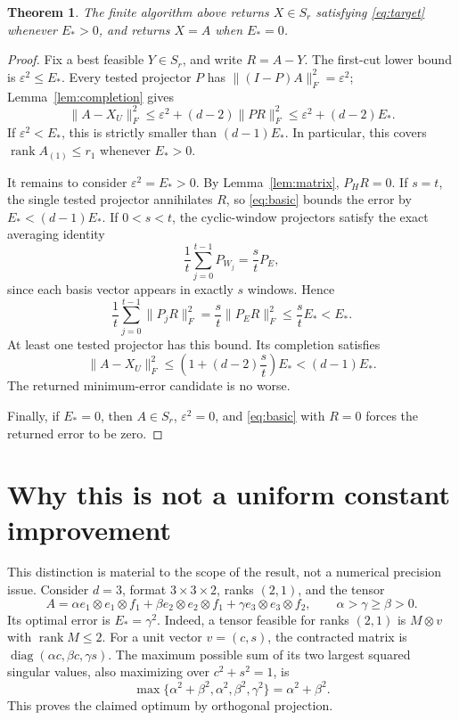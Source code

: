 \documentclass[11pt]{article}
\newtheorem{theorem}{Theorem}
\DeclareMathOperator{\rank}{rank}
\begin{document}
\begin{theorem}\label{thm:strict}
The finite algorithm above returns $X\in S_r$ satisfying
\eqref{eq:target} whenever $E_*>0$, and returns $X=A$ when $E_*=0$.
\end{theorem}
\begin{proof}
Fix a best feasible $Y\in S_r$, and write $R=A-Y$.
The first-cut lower bound is $\varepsilon^2\le E_*$.
Every tested projector $P$ has $\|(I-P)A\|_F^2=\varepsilon^2$;
Lemma~\ref{lem:completion} gives
\begin{equation}\label{eq:basic}
 \|A-X_U\|_F^2
 \le\varepsilon^2+(d-2)\|PR\|_F^2
 \le\varepsilon^2+(d-2)E_*.
\end{equation}
If $\varepsilon^2<E_*$, this is strictly smaller than $(d-1)E_*$.
In particular, this covers $\rank A_{(1)}\le r_1$ whenever $E_*>0$.

It remains to consider $\varepsilon^2=E_*>0$. By
Lemma~\ref{lem:matrix}, $P_HR=0$. If $s=t$, the single tested
projector annihilates $R$, so \eqref{eq:basic} bounds the error by
$E_*<(d-1)E_*$. If $0<s<t$, the cyclic-window projectors satisfy the
exact averaging identity
\[
 \frac1t\sum_{j=0}^{t-1}P_{W_j}=\frac{s}{t}P_E,
\]
since each basis vector appears in exactly $s$ windows. Hence
\[
 \frac1t\sum_{j=0}^{t-1}\|P_jR\|_F^2
 =\frac{s}{t}\|P_ER\|_F^2
 \le\frac{s}{t}E_*<E_*.
\]
At least one tested projector has this bound. Its completion satisfies
\[
 \|A-X_U\|_F^2
 \le\left(1+(d-2)\frac{s}{t}\right)E_*
 <(d-1)E_*.
\]
The returned minimum-error candidate is no worse.

Finally, if $E_*=0$, then $A\in S_r$, $\varepsilon^2=0$, and
\eqref{eq:basic} with $R=0$ forces the returned error to be zero.
\end{proof}

\section{Why this is not a uniform constant improvement}
This distinction is material to the scope of the result, not a numerical
precision issue. Consider $d=3$, format $3\times3\times2$, ranks $(2,1)$,
and the tensor
\[
 A=\alpha e_1\otimes e_1\otimes f_1
   +\beta e_2\otimes e_2\otimes f_1
   +\gamma e_3\otimes e_3\otimes f_2,
 \qquad \alpha>\gamma\ge\beta>0.
\]
Its optimal error is $E_*=\gamma^2$.
Indeed, a tensor feasible for ranks $(2,1)$ is $M\otimes v$ with
$\rank M\le2$. For a unit vector $v=(c,s)$, the contracted matrix is
$\operatorname{diag}(\alpha c,\beta c,\gamma s)$. The maximum possible
sum of its two largest squared singular values, also maximizing over
$c^2+s^2=1$, is
\[
 \max\{\alpha^2+\beta^2,\alpha^2,\beta^2,\gamma^2\}
 =\alpha^2+\beta^2.
\]
This proves the claimed optimum by orthogonal projection.
\end{document}
